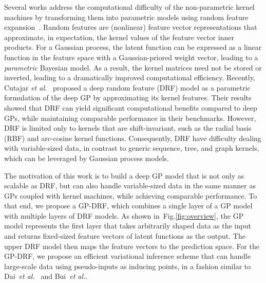 \documentclass[conference]{IEEEtran}
\begin{document}
Several works address the computational difficulty of the non-parametric kernel machines by transforming them into parametric models using random feature expansion~\cite{rf_fourier, rf_arccos}. Random features are (nonlinear) feature vector representations that approximate, in expectation, the kernel values of the feature vector inner products. For a Gaussian process, the latent function can be expressed as a linear function in the feature space with a Gaussian-priored weight vector, leading to a {\em parametric} Bayesian model. As  a result, the kernel matrices need not be stored or inverted, leading to a dramatically improved computational efficiency.  Recently, Cutajar {\em et al.}~\cite{rfdnn17} proposed a deep random feature (DRF) model as a parametric formulation of the deep GP by approximating its kernel features. Their results showed that DRF can yield significant computational benefits compared to deep GPs, while maintaining comparable performance in their benchmarks. However, DRF is limited only to kernels that are shift-invariant, such as the radial basis (RBF) and arc-cosine kernel functions. Consequently, DRF have difficulty dealing with variable-sized data, in contrast to generic sequence, tree, and graph kernels, which can be leveraged by Gaussian process models. 

The motivation of this work is to build a deep GP model that is not only as scalable as DRF, but can also handle variable-sized data in the same manner as GPs coupled with kernel machines, while achieving comparable performance. To that end, we propose a GP-DRF, which combines a single layer of a GP model with multiple layers of DRF models. As shown in~Fig.\ref{fig:overview}, the GP model represents the first layer that takes arbitrarily shaped data as the input and returns fixed-sized feature vectors of latent functions as the output. The upper DRF model then maps the feature vectors to the prediction space. For the GP-DRF, we propose an efficient variational inference scheme that can handle large-scale data using pseudo-inputs as inducing points, in a fashion similar to Dai~{\em et al.}~\cite{dai2015variational} and Bui~{\em et al.}\cite{bui2016deep}.
\end{document}
